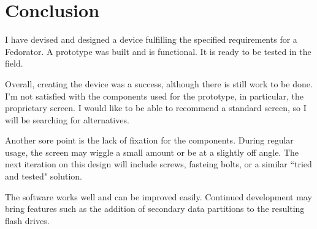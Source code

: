         
        \begin{comment}
        \todo{These are the final instructions that will be the "result" of the work.  Should they be inlined here?}
        \subsection{Bill of Materials}
            \todo{What is needed to get started - include a table and cost}
            \blind[3]
        \subsection{Step-by-step tutorial}
            \todo{The meat: how to build it from grounds up}
            \todo{Will not be present here, rather as an attachment.}
        \end{comment}
    \section{Conclusion}
        I have devised and designed a device fulfilling the specified requirements for a Fedorator.  A prototype was built and is functional.  It is ready to be tested in the field.
        
        Overall, creating the device was a success, although there is still work to be done.  I'm not satisfied with the components used for the prototype, in particular, the proprietary screen.  I would like to be able to recommend a standard screen, so I will be searching for alternatives.
        
        Another sore point is the lack of fixation for the components.  During regular usage, the screen may wiggle a small amount or be at a slightly off angle.  The next iteration on this design will include screws, fasteing bolts, or a similar ``tried and tested" solution.
        
        The software works well and can be improved easily.  Continued development may bring features such as the addition of secondary data partitions to the resulting flash drives.
        
